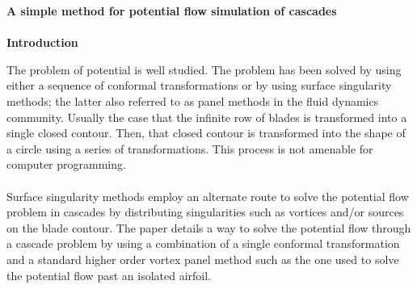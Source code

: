 \documentclass{article}
\begin{document}
\noindent \textbf{A simple method for potential flow simulation of cascades}\\\\

\noindent \textbf{Introduction}

\noindent The problem of potential is well studied. The problem has been solved by using either a sequence of conformal transformations or by using surface singularity methods; the latter also referred to as panel methods in the fluid dynamics community. Usually the case that the infinite row of blades is transformed into a single closed contour. Then, that closed contour is transformed into the shape of a circle using a series of transformations. This process is not amenable for computer programming. \\\\
Surface singularity methods employ an alternate route to solve the potential flow problem in cascades by distributing singularities such as vortices and/or sources on the blade contour. The paper details a way to solve the potential flow through a cascade problem by using a combination of a single conformal transformation and a standard higher order vortex panel method such as the one used to solve the potential flow past an isolated airfoil.\\\\
\end{document}
